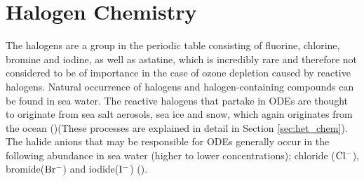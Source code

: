 

%





\section{Halogen Chemistry}\label{sec:halogen_chemistry}


The halogens are a group in the periodic table consisting of fluorine, chlorine, bromine and iodine, as well as astatine, which is incredibly rare and therefore not considered to be of importance in the case of ozone depletion caused by reactive halogens. Natural occurrence of halogens and halogen-containing compounds can be found in sea water. The reactive halogens that partake in ODEs  are thought to originate from sea salt aerosols, sea ice and snow, which again originates from the ocean (\cite{Foster2001})(These processes are explained in detail in Section \ref{sec:het_chem}). The halide anions that may be responsible for ODEs generally occur in the following abundance in sea water (higher to lower concentrations); chloride ($\mathrm{Cl^-}$), bromide($\mathrm{Br^-}$) and iodide($\mathrm{I^-}$) (\cite{Simpson2015}). 

